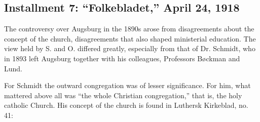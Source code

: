 

\subsection{Installment 7: “Folkebladet,” April 24, 1918}




The controversy over Augsburg in the 1890s arose from disagreements about the concept of the church, disagreements that also shaped ministerial education. The view held by S. and O. differed greatly, especially from that of Dr. Schmidt, who in 1893 left Augsburg together with his colleagues, Professors Bøckman and Lund.

For Schmidt the outward congregation was of lesser significance. For him, what mattered above all was “the whole Christian congregation,” that is, the holy catholic Church. His concept of the church is found in Luthersk Kirkeblad, no. 41:

